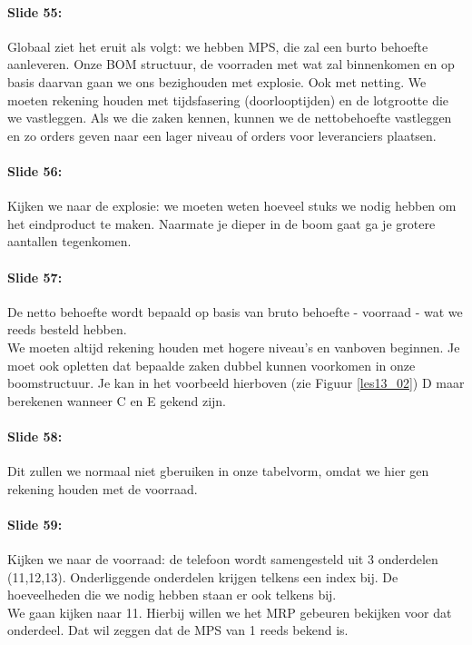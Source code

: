 \documentclass[10pt,a4paper]{report}
\begin{document}
\paragraph{Slide 55:} Globaal ziet het eruit als volgt: we hebben MPS, die zal een burto behoefte aanleveren. Onze BOM structuur, de voorraden met wat zal binnenkomen en op basis  daarvan gaan we ons bezighouden met explosie. Ook met netting. We moeten rekening houden met tijdsfasering (doorlooptijden) en de lotgrootte die we vastleggen. Als we die zaken kennen, kunnen we de nettobehoefte vastleggen en zo orders geven naar een lager niveau of orders voor leveranciers plaatsen. 

\paragraph{Slide 56:} Kijken we naar de explosie: we moeten weten hoeveel stuks we nodig hebben om het eindproduct te maken. Naarmate je dieper in de boom gaat ga je grotere aantallen tegenkomen. 

\paragraph{Slide 57:} De netto behoefte wordt bepaald op basis van bruto behoefte - voorraad - wat we reeds besteld hebben.\\
We moeten altijd rekening houden met hogere niveau's en vanboven beginnen. Je moet ook opletten dat bepaalde zaken dubbel kunnen voorkomen in onze boomstructuur. Je kan in het voorbeeld hierboven (zie Figuur \ref{les13_02}) D maar berekenen wanneer C en E gekend zijn. 

\paragraph{Slide 58:} Dit zullen we normaal niet gberuiken in onze tabelvorm, omdat we hier gen rekening houden met de voorraad. 

\paragraph{Slide 59:} Kijken we naar de voorraad: de telefoon wordt samengesteld uit 3 onderdelen (11,12,13). Onderliggende onderdelen krijgen telkens een index bij. De hoeveelheden die we nodig hebben staan er ook telkens bij.\\
We gaan kijken naar 11. Hierbij willen we het MRP gebeuren bekijken voor dat onderdeel. Dat wil zeggen dat de MPS van 1 reeds bekend is.
\end{document}
